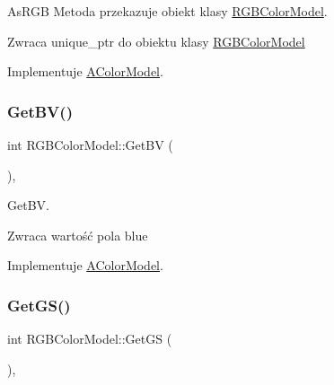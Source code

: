 As\+R\+GB Metoda przekazuje obiekt klasy \mbox{\hyperlink{class_r_g_b_color_model}{R\+G\+B\+Color\+Model}}. 

\begin{DoxyReturn}{Zwraca}
unique\+\_\+ptr do obiektu klasy \mbox{\hyperlink{class_r_g_b_color_model}{R\+G\+B\+Color\+Model}} 
\end{DoxyReturn}


Implementuje \mbox{\hyperlink{class_a_color_model}{A\+Color\+Model}}.

\mbox{\label{class_r_g_b_color_model_af87d29172cf3dc37e8b67926c323d521}} 
\subsubsection{\texorpdfstring{Get\+B\+V()}{GetBV()}}
{\footnotesize\ttfamily int R\+G\+B\+Color\+Model\+::\+Get\+BV (\begin{DoxyParamCaption}{ }\end{DoxyParamCaption})\hspace{0.3cm}{\ttfamily [override]}, {\ttfamily [virtual]}}



Get\+BV. 

\begin{DoxyReturn}{Zwraca}
wartość pola blue 
\end{DoxyReturn}


Implementuje \mbox{\hyperlink{class_a_color_model}{A\+Color\+Model}}.

\mbox{\label{class_r_g_b_color_model_ab90ddb80c57a81ca93b6c6b2aec21a88}} 
\subsubsection{\texorpdfstring{Get\+G\+S()}{GetGS()}}
{\footnotesize\ttfamily int R\+G\+B\+Color\+Model\+::\+Get\+GS (\begin{DoxyParamCaption}{ }\end{DoxyParamCaption})\hspace{0.3cm}{\ttfamily [override]}, {\ttfamily [virtual]}}



